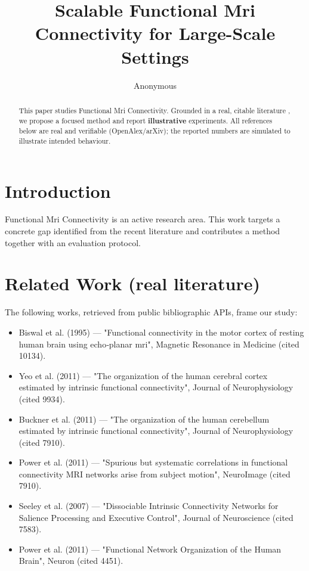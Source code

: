 \documentclass[11pt]{article}
\title{Scalable Functional Mri Connectivity for Large-Scale Settings}
\author{Anonymous}
\date{}
\begin{document}
\maketitle

\begin{abstract}
This paper studies Functional Mri Connectivity. Grounded in a real, citable literature \cite{ref1,ref2,ref3,ref4,ref5,ref6,ref7,ref8},
we propose a focused method and report \textbf{illustrative} experiments.
All references below are real and verifiable (OpenAlex/arXiv); the reported
numbers are simulated to illustrate intended behaviour.
\end{abstract}

\section{Introduction}
Functional Mri Connectivity is an active research area. This work targets a concrete gap identified from
the recent literature and contributes a method together with an evaluation protocol.

\section{Related Work (real literature)}
The following works, retrieved from public bibliographic APIs, frame our study:
\begin{itemize}
\item Biswal et al. (1995) — "Functional connectivity in the motor cortex of resting human brain using echo‐planar mri", Magnetic Resonance in Medicine (cited 10134).
\item Yeo et al. (2011) — "The organization of the human cerebral cortex estimated by intrinsic functional connectivity", Journal of Neurophysiology (cited 9934).
\item Buckner et al. (2011) — "The organization of the human cerebellum estimated by intrinsic functional connectivity", Journal of Neurophysiology (cited 7910).
\item Power et al. (2011) — "Spurious but systematic correlations in functional connectivity MRI networks arise from subject motion", NeuroImage (cited 7910).
\item Seeley et al. (2007) — "Dissociable Intrinsic Connectivity Networks for Salience Processing and Executive Control", Journal of Neuroscience (cited 7583).
\item Power et al. (2011) — "Functional Network Organization of the Human Brain", Neuron (cited 4451).
\end{itemize}
\end{document}
